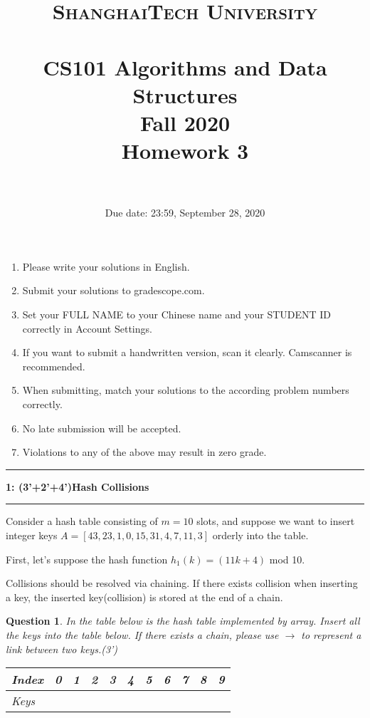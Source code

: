 \documentclass[10.5pt]{article}
\title{
	\normalfont \normalsize
	\textsc{ShanghaiTech University} \\ [25pt]
	\horrule{0.5pt} \\[0.4cm] %
	\huge CS101 Algorithms and Data Structures\\ %
	\LARGE Fall 2020\\
	\LARGE Homework 3\\
	\horrule{2pt} \\[0.5cm] %
}
\author{}
\date{Due date: 23:59, September 28, 2020}
\newcommand\question[2]{\vspace{.25in}\hrule\textbf{#1: #2}\vspace{.5em}\hrule\vspace{.10in}}
\newtheorem{Q}{Question}
\begin{document}
	
	\maketitle
	\thispagestyle{firstpage}
	\vspace{3ex}
	
	\begin{enumerate}
		\item Please write your solutions in English. 
		
		\item Submit your solutions to gradescope.com.  
		
		\item Set your FULL NAME to your Chinese name and your STUDENT ID correctly in Account Settings. 
		
		\item If you want to submit a handwritten version, scan it clearly. Camscanner is recommended. 
		
		\item When submitting, match your solutions to the according problem numbers correctly. 
		
		\item No late submission will be accepted.
		
		\item Violations to any of the above may result in zero grade. 
	\end{enumerate}
	\newpage
	
  \question{1}{(3'+2'+4')Hash Collisions}
    Consider a hash table consisting of $m= 10$ slots, and suppose we want to insert integer keys $A = [43, 23, 1 , 0,15 ,31 ,4 ,7 ,11 ,3]$ orderly into the table.
    
    First, let's suppose the hash function $h_1(k) = (11k+4)$ mod 10.
    
    Collisions should be resolved via chaining. If there exists collision when inserting a key, the inserted
key(collision) is stored at the end of a chain.
\begin{Q}In the table below is the hash table implemented by array. Insert all the keys into the table below. If there exists a chain, please use $\rightarrow$
to represent a link between two keys.(3')
\begin{table}[ht]
\begin{tabular}{|l|p{1.2cm}|p{1.2cm}|p{1.2cm}|p{1.2cm}|p{1.2cm}|p{1.2cm}|p{1.2cm}|p{1.2cm}|p{1.2cm}|p{1.2cm}|}
\hline
Index & 0&1&2&3&4&5&6&7&8&9 \\ \hline
Keys     & &&&&&&&&&     \\ \hline
\end{tabular}
\end{table}
\end{Q}
\end{document}

